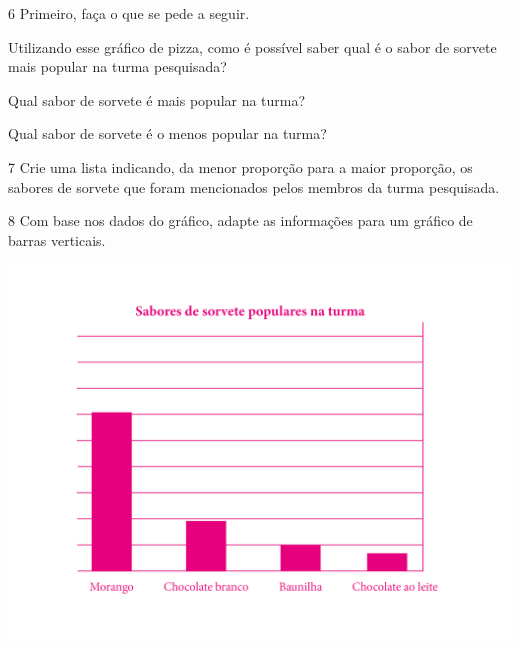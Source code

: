 \num{6} Primeiro, faça o que se pede a seguir.

\begin{escolha}
\item Utilizando esse gráfico de pizza, como é possível saber qual é o sabor de sorvete mais popular na turma pesquisada?


\item Qual sabor de sorvete é mais popular na turma?


\item Qual sabor de sorvete é o menos popular na turma?

\end{escolha}

\num{7} Crie uma lista indicando, da menor proporção para a maior proporção, os sabores de sorvete que foram mencionados pelos membros da turma pesquisada.


\num{8} Com base nos dados do gráfico, adapte as informações para um gráfico de barras verticais.

\begin{mdframed}[linewidth=2pt,linecolor=salmao]
\includegraphics[width=\textwidth]{../ilustracoes/POR5/SAEB_5ANO_POR_FIGURA4.png}
\end{mdframed}

